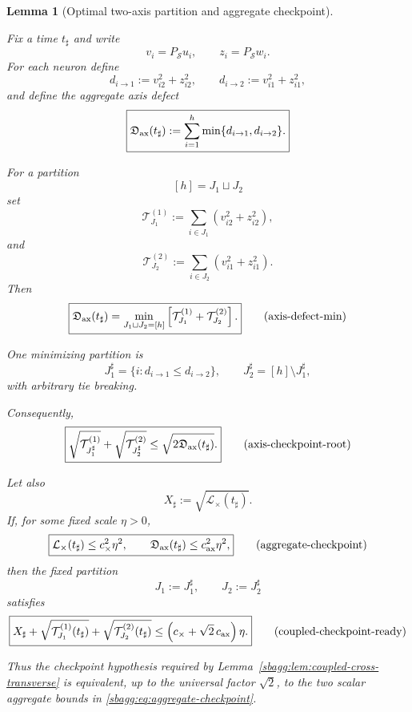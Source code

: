 \documentclass{article} %
\theoremstyle{plain}
\newtheorem{lemma}[theorem]{Lemma}
\theoremstyle{definition}
\theoremstyle{remark}
\begin{document}
\begin{lemma}[Optimal two-axis partition and aggregate checkpoint]
\label{sbagg:lem:optimal-axis-checkpoint}

Fix a time $t_\sharp$ and write
\[
v_i=P_{\mathcal S}u_i,
\qquad
z_i=P_{\mathcal S}w_i.
\]
For each neuron define
\[
d_{i\to1}
:=
v_{i2}^2+z_{i2}^2,
\qquad
d_{i\to2}
:=
v_{i1}^2+z_{i1}^2,
\]
and define the aggregate axis defect
\[
\boxed{
\mathfrak D_{\rm ax}(t_\sharp)
:=
\sum_{i=1}^h
\min\{d_{i\to1},d_{i\to2}\}.
}
\]

For a partition
\[
[h]=J_1\sqcup J_2
\]
set
\[
\mathcal T_{J_1}^{(1)}
:=
\sum_{i\in J_1}
(v_{i2}^2+z_{i2}^2),
\]
and
\[
\mathcal T_{J_2}^{(2)}
:=
\sum_{i\in J_2}
(v_{i1}^2+z_{i1}^2).
\]
Then
\[
\boxed{
\mathfrak D_{\rm ax}(t_\sharp)
=
\min_{J_1\sqcup J_2=[h]}
\left[
\mathcal T_{J_1}^{(1)}
+
\mathcal T_{J_2}^{(2)}
\right].
}
\tag{axis-defect-min}
\label{sbagg:eq:axis-defect-min}
\]

One minimizing partition is
\[
\boxed{
J_1^\sharp
=
\{i:d_{i\to1}\le d_{i\to2}\},
\qquad
J_2^\sharp=[h]\setminus J_1^\sharp,
}
\tag{optimal-axis-partition}
\label{sbagg:eq:optimal-axis-partition}
\]
with arbitrary tie breaking.

Consequently,
\[
\boxed{
\sqrt{\mathcal T_{J_1^\sharp}^{(1)}}
+
\sqrt{\mathcal T_{J_2^\sharp}^{(2)}}
\le
\sqrt{2\mathfrak D_{\rm ax}(t_\sharp)}.
}
\tag{axis-checkpoint-root}
\label{sbagg:eq:axis-checkpoint-root}
\]

Let also
\[
X_\sharp
:=
\sqrt{\mathcal L_\times(t_\sharp)}.
\]
If, for some fixed scale $\eta>0$,
\[
\boxed{
\mathcal L_\times(t_\sharp)
\le c_\times^2\eta^2,
\qquad
\mathfrak D_{\rm ax}(t_\sharp)
\le c_{\rm ax}^2\eta^2,
}
\tag{aggregate-checkpoint}
\label{sbagg:eq:aggregate-checkpoint}
\]
then the fixed partition
\[
J_1:=J_1^\sharp,
\qquad
J_2:=J_2^\sharp
\]
satisfies
\[
\boxed{
X_\sharp
+
\sqrt{\mathcal T_{J_1}^{(1)}(t_\sharp)}
+
\sqrt{\mathcal T_{J_2}^{(2)}(t_\sharp)}
\le
\left(c_\times+\sqrt2\,c_{\rm ax}\right)\eta.
}
\tag{coupled-checkpoint-ready}
\label{sbagg:eq:coupled-checkpoint-ready}
\]

Thus the checkpoint hypothesis required by
Lemma~\ref{sbagg:lem:coupled-cross-transverse}
is equivalent, up to the universal factor $\sqrt2$, to the two scalar
aggregate bounds in \eqref{sbagg:eq:aggregate-checkpoint}.
\end{lemma}
\end{document}

